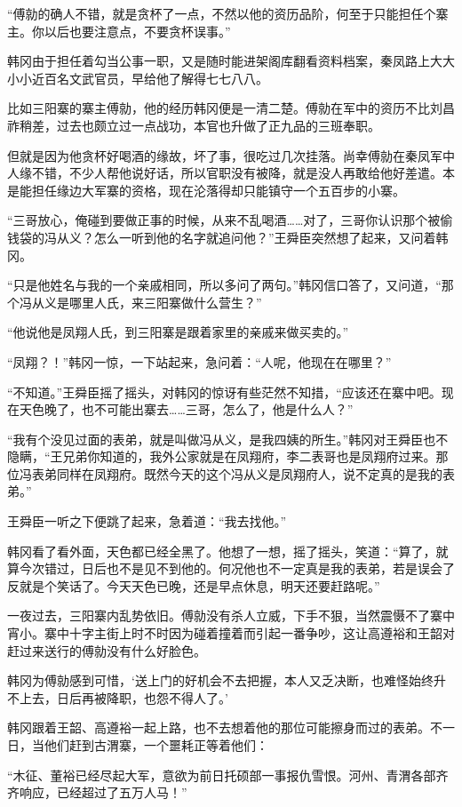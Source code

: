 “傅勍的确人不错，就是贪杯了一点，不然以他的资历品阶，何至于只能担任个寨主。你以后也要注意点，不要贪杯误事。”

韩冈由于担任着勾当公事一职，又是随时能进架阁库翻看资料档案，秦凤路上大大小小近百名文武官员，早给他了解得七七八八。

比如三阳寨的寨主傅勍，他的经历韩冈便是一清二楚。傅勍在军中的资历不比刘昌祚稍差，过去也颇立过一点战功，本官也升做了正九品的三班奉职。

但就是因为他贪杯好喝酒的缘故，坏了事，很吃过几次挂落。尚幸傅勍在秦凤军中人缘不错，不少人帮他说好话，所以官职没有被降，就是没人再敢给他好差遣。本是能担任缘边大军寨的资格，现在沦落得却只能镇守一个五百步的小寨。

“三哥放心，俺碰到要做正事的时候，从来不乱喝酒……对了，三哥你认识那个被偷钱袋的冯从义？怎么一听到他的名字就追问他？”王舜臣突然想了起来，又问着韩冈。

“只是他姓名与我的一个亲戚相同，所以多问了两句。”韩冈信口答了，又问道，“那个冯从义是哪里人氏，来三阳寨做什么营生？”

“他说他是凤翔人氏，到三阳寨是跟着家里的亲戚来做买卖的。”

“凤翔？！”韩冈一惊，一下站起来，急问着：“人呢，他现在在哪里？”

“不知道。”王舜臣摇了摇头，对韩冈的惊讶有些茫然不知措，“应该还在寨中吧。现在天色晚了，也不可能出寨去……三哥，怎么了，他是什么人？”

“我有个没见过面的表弟，就是叫做冯从义，是我四姨的所生。”韩冈对王舜臣也不隐瞒，“王兄弟你知道的，我外公家就是在凤翔府，李二表哥也是凤翔府过来。那位冯表弟同样在凤翔府。既然今天的这个冯从义是凤翔府人，说不定真的是我的表弟。”

王舜臣一听之下便跳了起来，急着道：“我去找他。”

韩冈看了看外面，天色都已经全黑了。他想了一想，摇了摇头，笑道：“算了，就算今次错过，日后也不是见不到他的。何况他也不一定真是我的表弟，若是误会了反就是个笑话了。今天天色已晚，还是早点休息，明天还要赶路呢。”

一夜过去，三阳寨内乱势依旧。傅勍没有杀人立威，下手不狠，当然震慑不了寨中宵小。寨中十字主街上时不时因为碰着撞着而引起一番争吵，这让高遵裕和王韶对赶过来送行的傅勍没有什么好脸色。

韩冈为傅勍感到可惜，‘送上门的好机会不去把握，本人又乏决断，也难怪始终升不上去，日后再被降职，也怨不得人了。’

韩冈跟着王韶、高遵裕一起上路，也不去想着他的那位可能擦身而过的表弟。不一日，当他们赶到古渭寨，一个噩耗正等着他们：

“木征、董裕已经尽起大军，意欲为前日托硕部一事报仇雪恨。河州、青渭各部齐齐响应，已经超过了五万人马！”

